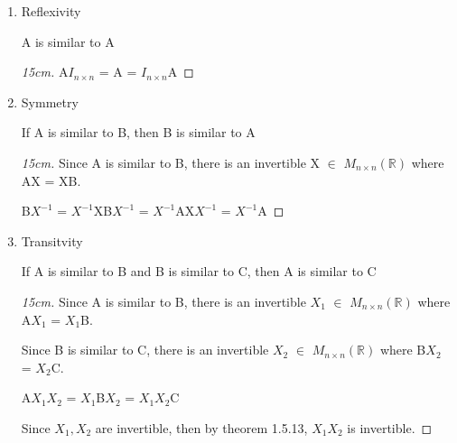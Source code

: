     \begin{enumerate}[label=(\alph*), leftmargin=2cm, itemsep=0.1cm]
        \item {\color{lgreen} Reflexivity}
        
            \hspace{0.5cm}
            A is similar to A

            \begin{proof}[15cm]
                A$I_{n \times n}$ = A = $I_{n \times n}$A
            \end{proof}

        \item {\color{lgreen} Symmetry}
        
            \hspace{0.5cm}
            If A is similar to B, then B is similar to A

            \begin{proof}[15cm]
                Since A is similar to B, there is an invertible
                X $\in$ $M_{n \times n}(\mathbb{R})$ where AX = XB.

                \hspace{0.5cm}
                B$X^{-1}$
                = $X^{-1}$XB$X^{-1}$
                = $X^{-1}$AX$X^{-1}$
                = $X^{-1}$A
            \end{proof}

        \item {\color{lgreen} Transitvity}
        
            \hspace{0.5cm}
            If A is similar to B and B is similar to C, then
            A is similar to C

            \begin{proof}[15cm]
                Since A is similar to B, there is an invertible
                $X_1$ $\in$ $M_{n \times n}(\mathbb{R})$ where A$X_1$ = $X_1$B.

                Since B is similar to C, there is an invertible
                $X_2$ $\in$ $M_{n \times n}(\mathbb{R})$ where B$X_2$ = $X_2$C.

                \hspace{0.5cm}
                A$X_1X_2$
                = $X_1$B$X_2$
                = $X_1X_2$C

                Since $X_1,X_2$ are invertible,
                then by {\color{red} theorem 1.5.13}, $X_1X_2$
                is invertible.
            \end{proof}
    \end{enumerate}

